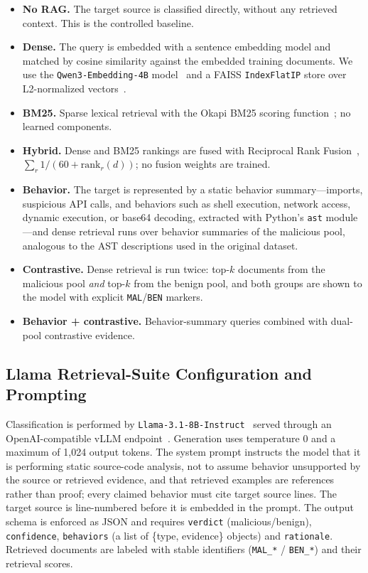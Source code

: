 \begin{itemize}
    \item \textbf{No RAG.} The target source is classified directly,
    without any retrieved context. This is the controlled baseline.
    \item \textbf{Dense.} The query is embedded with a sentence embedding
    model and matched by cosine similarity against the embedded training
    documents. We use the \texttt{Qwen3-Embedding-4B} model~\cite{qwen3emb}
    and a FAISS \texttt{IndexFlatIP} store over L2-normalized
    vectors~\cite{vllm2023}.
    \item \textbf{BM25.} Sparse lexical retrieval with the Okapi BM25
    scoring function~\cite{bm252009}; no learned components.
    \item \textbf{Hybrid.} Dense and BM25 rankings are fused with Reciprocal
    Rank Fusion~\cite{rrf2009}, $\sum_r 1/(60 + \mathrm{rank}_r(d))$; no
    fusion weights are trained.
    \item \textbf{Behavior.} The target is represented by a static behavior
    summary---imports, suspicious API calls, and behaviors such as shell
    execution, network access, dynamic execution, or base64 decoding,
    extracted with Python's \texttt{ast} module---and dense retrieval runs
    over behavior summaries of the malicious pool, analogous to the AST
    descriptions used in the original dataset.
    \item \textbf{Contrastive.} Dense retrieval is run twice: top-$k$
    documents from the malicious pool \emph{and} top-$k$ from the benign
    pool, and both groups are shown to the model with explicit
    \texttt{MAL}/\texttt{BEN} markers.
    \item \textbf{Behavior + contrastive.} Behavior-summary queries combined
    with dual-pool contrastive evidence.
\end{itemize}

\subsection{Llama Retrieval-Suite Configuration and Prompting}
\label{sec:llm-config}

Classification is performed by \texttt{Llama-3.1-8B-Instruct}~\cite{llama3}
served through an OpenAI-compatible vLLM endpoint~\cite{vllm2023}. Generation
uses temperature $0$ and a maximum of 1{,}024 output tokens. The system prompt
instructs the model that it is performing static source-code analysis, not to
assume behavior unsupported by the source or retrieved evidence, and that
retrieved examples are references rather than proof; every claimed behavior
must cite target source lines. The target source is line-numbered before it is
embedded in the prompt. The output schema is enforced as JSON and requires
\texttt{verdict} (malicious/benign), \texttt{confidence},
\texttt{behaviors} (a list of \{type, evidence\} objects) and
\texttt{rationale}. Retrieved documents are labeled with stable identifiers
(\texttt{MAL\_*} / \texttt{BEN\_*}) and their retrieval scores.

